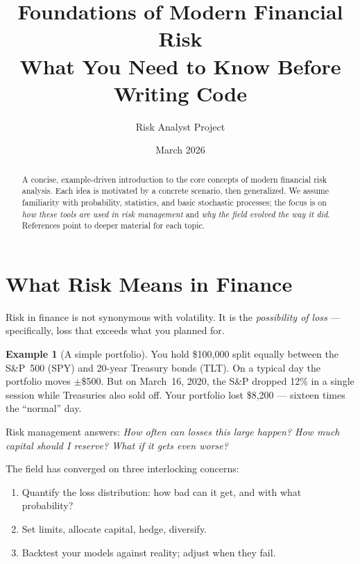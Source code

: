 \documentclass[11pt, a4paper]{article}
\title{%
    \textbf{Foundations of Modern Financial Risk} \\[0.5em]
    \large What You Need to Know Before Writing Code
}
\author{Risk Analyst Project}
\date{March 2026}
\theoremstyle{definition}
\newtheorem{example}{Example}[section]
\theoremstyle{plain}
\theoremstyle{remark}
\begin{document}
\maketitle

\begin{abstract}
A concise, example-driven introduction to the core concepts of modern financial risk analysis.
Each idea is motivated by a concrete scenario, then generalized.
We assume familiarity with probability, statistics, and basic stochastic processes;
the focus is on \emph{how these tools are used in risk management} and \emph{why the field evolved the way it did}.
References point to deeper material for each topic.
\end{abstract}

\tableofcontents
\newpage

\section{What Risk Means in Finance}

Risk in finance is not synonymous with volatility.
It is the \emph{possibility of loss} --- specifically, loss that exceeds what you planned for.

\begin{example}[A simple portfolio]
You hold \$100{,}000 split equally between the S\&P~500 (SPY) and 20-year Treasury bonds (TLT).
On a typical day the portfolio moves $\pm$\$500.
But on March~16, 2020, the S\&P dropped 12\% in a single session while Treasuries also sold off.
Your portfolio lost \$8{,}200 --- sixteen times the ``normal'' day.

Risk management answers: \emph{How often can losses this large happen?
How much capital should I reserve?
What if it gets even worse?}
\end{example}

The field has converged on three interlocking concerns:

\begin{enumerate}[leftmargin=2cm]
    \item[\textbf{Measure}] Quantify the loss distribution: how bad can it get, and with what probability?
    \item[\textbf{Manage}] Set limits, allocate capital, hedge, diversify.
    \item[\textbf{Monitor}] Backtest your models against reality; adjust when they fail.
\end{enumerate}
\end{document}

